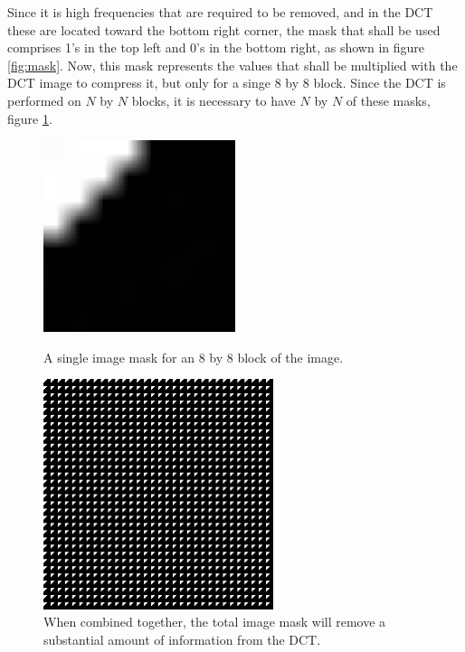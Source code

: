 Since it is high frequencies that are required to be removed, and in the DCT these are located toward the bottom right corner, the mask that shall be used comprises 1's in the top left and 0's in the bottom right, as shown in figure \ref{fig:mask}. Now, this mask represents the values that shall be multiplied with the DCT image to compress it, but only for a singe 8 by 8 block. Since the DCT is performed on $N$ by $N$ blocks, it is necessary to have $N$ by $N$ of these masks, figure \ref{fig:NxN_mask}.
\begin{figure}[ht]
	\centering
	\begin{minipage}[c]{0.45\linewidth}
		\centering
	 	\includegraphics[width=0.5\textwidth]{mask.jpg}
	 	\caption{A single image mask for an 8 by 8 block of the image.\label{fig:mask}}
	\end{minipage}
	\begin{minipage}[c]{0.45\linewidth}
		\centering
	 	\includegraphics[width=0.6\textwidth]{NxN_mask.jpg}
	 	\caption{When combined together, the total image mask will remove a substantial amount of information from the DCT.\label{fig:NxN_mask}}
	\end{minipage}
\end{figure}

